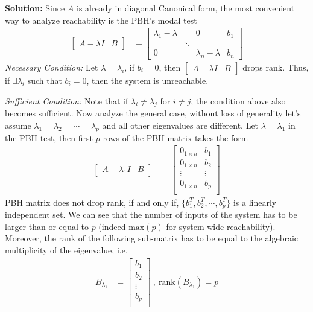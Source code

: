 \documentclass[twoside]{article}
\begin{document}
\textbf{Solution:} Since $A$ is already in diagonal Canonical 
form, the most convenient way to analyze reachability is the PBH's modal
test 
%
\begin{align*}
  \left[ \begin{array}{c|c} A - \lambda I & B \end{array} \right]
  &= \left[ \begin{array}{ccc|c} 
  \lambda_1 - \lambda & & 0 & b_1 \\
    & \ddots &
    \\
    0 & &  \lambda_n - \lambda & b_n \end{array} \right]
\end{align*}
%
\textit{Necessary Condition:} Let $\lambda = \lambda_i$, if $b_i = 0$,
then $\left[ \begin{array}{c|c} A - \lambda I & B \end{array} \right]$
drops rank. Thus, if $\exists \lambda_i$ such that $b_i = 0$, then the system 
is unreachable. 

\textit{Sufficient Condition:} Note that if $\lambda_i \neq \lambda_j$ for $i \neq j$,
the condition above also becomes sufficient. Now analyze the general case, without loss 
of generality let's assume $\lambda_1 = \lambda_2 = \cdots = \lambda_p$ and all other 
eigenvalues are different. Let $\lambda = \lambda_1$ in the PBH test, then first $p$-rows of the
PBH matrix takes the form
%
\begin{align*}
  \left[ \begin{array}{c|c} A - \lambda_1 I & B \end{array} \right]
  &= \left[ \begin{array}{c|c} 
  0_{1 \times n} & b_1 \\
  0_{1 \times n} & b_2 \\
  \vdots & \vdots \\
  0_{1 \times n} & b_p \\
     \end{array} \right]
\end{align*}
%
PBH matrix does not drop rank, if and only if, $\lbrace b_1^T , b_2^T , \cdots , b_p^T \rbrace$ 
is a linearly independent set. We can see that the number of inputs of the system has to be larger than 
or equal to $p$ (indeed $\mathrm{max}(p)$ for system-wide reachability). Moreover, the rank of the 
following sub-matrix has to be equal to the algebraic multiplicity of the eigenvalue, i.e.
%
\begin{align*}
  B_{\lambda_1}
  &= \left[ \begin{array}{c} 
  b_1 \\
  b_2 \\
  \vdots \\
  b_p \\
     \end{array} \right] \ , \ \mathrm{rank}(B_{\lambda_1}) = p  
\end{align*}
%
\end{document}
